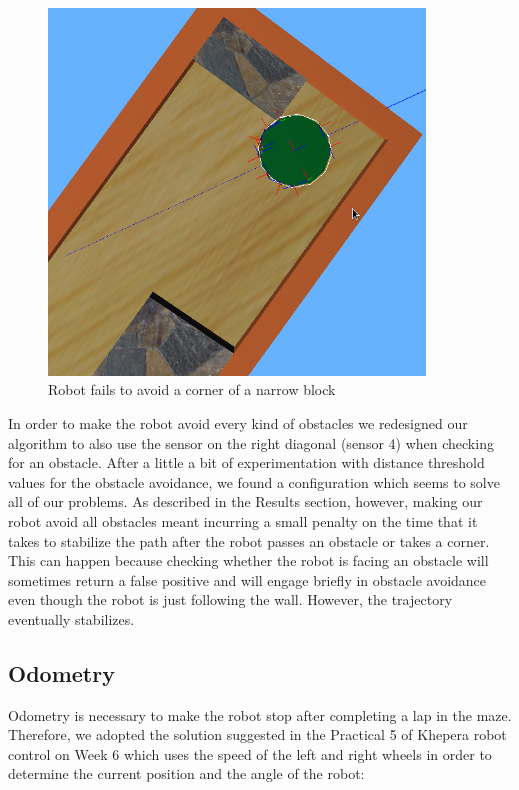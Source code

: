 \documentclass[10pt,a4paper]{article}
\begin{document}
\begin{figure}[htbp]
\centering
\includegraphics[width=10cm]{images/obstacle_avoidance_fail.png}
\caption{Robot fails to avoid a corner of a narrow block}
\end{figure}

In order to make the robot avoid every kind of obstacles we redesigned
our algorithm to also use the sensor on the right diagonal (sensor 4)
when checking for an obstacle. After a little a bit of experimentation
with distance threshold values for the obstacle avoidance, we found a
configuration which seems to solve all of our problems. As described in
the Results section, however, making our robot avoid all obstacles meant
incurring a small penalty on the time that it takes to stabilize the
path after the robot passes an obstacle or takes a corner. This can
happen because checking whether the robot is facing an obstacle will
sometimes return a false positive and will engage briefly in obstacle
avoidance even though the robot is just following the wall. However, the
trajectory eventually stabilizes.

\subsection{Odometry}\label{odometry}

Odometry is necessary to make the robot stop after completing a lap in
the maze. Therefore, we adopted the solution suggested in the Practical
5 of Khepera robot control on Week 6 which uses the speed of the left
and right wheels in order to determine the current position and the
angle of the robot:
\end{document}
